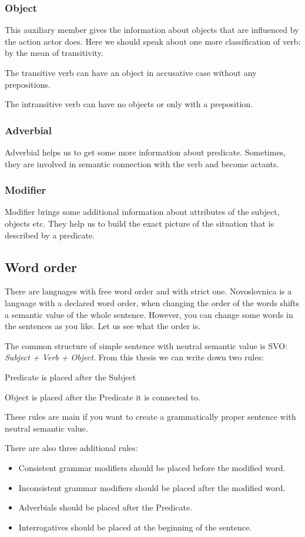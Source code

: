 \subsubsection{Object}
This auxiliary member gives the information about objects that are influenced by the action actor does. 
Here we should speak about one more classification of verb: by the mean of transitivity.

The transitive verb can have an object in accusative case without any prepositions.

The intransitive verb can have no objects or only with a preposition. 

\subsubsection{Adverbial}
Adverbial helps us to get some more information about predicate. Sometimes, they are involved in semantic connection with the verb and become actants. 

\subsubsection{Modifier}
Modifier brings some additional information about attributes of the subject, objects etc. They help us to build the exact picture of the situation that is described by a predicate.

\subsection{Word order}
There are languages with free word order and with strict one. Novoslovnica is a language with a declared word order, when changing the order of the words shifts a semantic value of the whole sentence. However, you can change some words in the sentences as you like. Let us see what the order is.

The common structure of simple sentence with neutral semantic value is SVO: \textit{Subject + Verb + Object}. From this thesis we can write down two rules:

Predicate is placed after the Subject

Object is placed after the Predicate it is connected to.

These rules are main if you want to create a grammatically proper sentence with neutral semantic value. 

There are also three additional rules:

\begin{itemize}
	\item Consistent grammar modifiers should be placed before the modified word.
	\item Inconsistent grammar modifiers should be placed after the modified word.
	\item Adverbials should be placed after the Predicate.
	\item Interrogatives should be placed at the beginning of the sentence.
\end{itemize}

